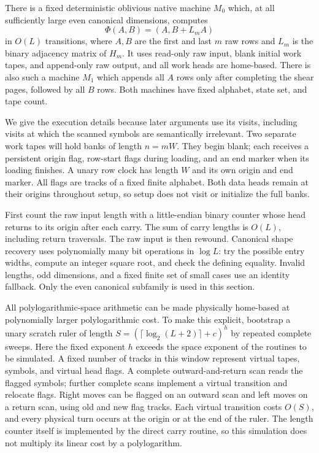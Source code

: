 \begin{proposition}\label{prop:ne-native-shear}
\notformalized
There is a fixed deterministic oblivious native machine $M_0$ which, at
all sufficiently large even canonical dimensions, computes
\[
 \Phi(A,B)=(A,B+L_mA)
\]
in $O(L)$ transitions, where $A,B$ are the first and last $m$ raw rows and
$L_m$ is the binary adjacency matrix of $H_m$.  It uses read-only raw
input, blank initial work tapes, and append-only raw output, and all work
heads are home-based.  There is also such a machine $M_1$ which appends
all $A$ rows only after completing the shear pages, followed by all $B$
rows.  Both machines have fixed alphabet, state set, and tape count.
\end{proposition}

\begin{informalproof}
We give the execution details because later arguments use its visits,
including visits at which the scanned symbols are semantically irrelevant.
Two separate work tapes will hold banks of length $n=mW$.  They begin
blank; each receives a persistent origin flag, row-start flags during
loading, and an end marker when its loading finishes.  A unary row clock
has length $W$ and its own origin and end marker.  All flags are tracks
of a fixed finite alphabet.  Both data heads remain at their origins
throughout setup, so setup does not visit or initialize the full banks.

First count the raw input length with a little-endian binary counter whose
head returns to its origin after each carry.  The sum of carry lengths is
$O(L)$, including return traversals.  The raw input is then rewound.
Canonical shape recovery uses polynomially many bit operations in
$\log L$: try the possible entry widths, compute an integer square root,
and check the defining equality.  Invalid lengths, odd dimensions, and a
fixed finite set of small cases use an identity fallback.  Only the even
canonical subfamily is used in this section.

All polylogarithmic-space arithmetic can be made physically home-based
at polynomially larger polylogarithmic cost.  To make this explicit,
bootstrap a unary scratch ruler of length $S=(\lceil\log_2(L+2)\rceil+c)^h$
by repeated complete sweeps.  Here the fixed exponent $h$ exceeds the
space exponent of the routines to be simulated.  A fixed number of tracks
in this window represent virtual tapes, symbols, and virtual head flags.
A complete outward-and-return scan reads the flagged symbols; further
complete scans implement a virtual transition and relocate flags.  Right
moves can be flagged on an outward scan and left moves on a return scan,
using old and new flag tracks.  Each virtual transition costs $O(S)$,
and every physical turn occurs at the origin or at the end of the ruler.
The length counter itself is implemented by the direct carry routine,
so this simulation does not multiply its linear cost by a polylogarithm.


\end{informalproof}
